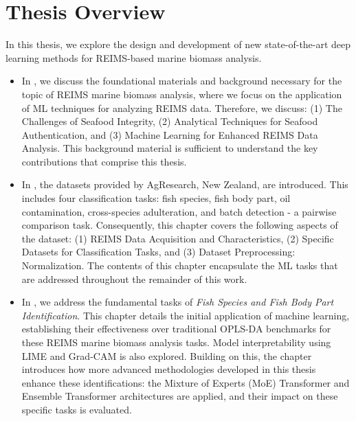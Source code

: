 \section{Thesis Overview}

In this thesis, we explore the design and development of new state-of-the-art deep learning methods for REIMS-based marine biomass analysis.

\begin{itemize}
\item In \textbf{}, we discuss the foundational materials and background necessary for the topic of REIMS marine biomass analysis, where we focus on the application of ML techniques for analyzing REIMS data. Therefore, we discuss: (1) The Challenges of Seafood Integrity, (2) Analytical Techniques for Seafood Authentication, and (3) Machine Learning for Enhanced REIMS Data Analysis. This background material is sufficient to understand the key contributions that comprise this thesis.

\item In \textbf{}, the datasets provided by AgResearch, New Zealand, are introduced. This includes four classification tasks: fish species, fish body part, oil contamination, cross-species adulteration, and batch detection - a pairwise comparison task. Consequently, this chapter covers the following aspects of the dataset: (1) REIMS Data Acquisition and Characteristics, (2) Specific Datasets for Classification Tasks, and (3) Dataset Preprocessing: Normalization. The contents of this chapter encapsulate the ML tasks that are addressed throughout the remainder of this work.

\item In \textbf{}, we address the fundamental tasks of \textit{Fish Species and Fish Body Part Identification}. This chapter details the initial application of machine learning,
establishing their effectiveness over traditional OPLS-DA benchmarks for these REIMS marine biomass analysis tasks. Model interpretability using LIME and Grad-CAM is also explored. Building on this, the chapter introduces how more advanced methodologies developed in this thesis enhance these identifications: the Mixture of Experts (MoE) Transformer and Ensemble Transformer architectures are applied, and their impact on these specific tasks is evaluated.


\end{itemize}
